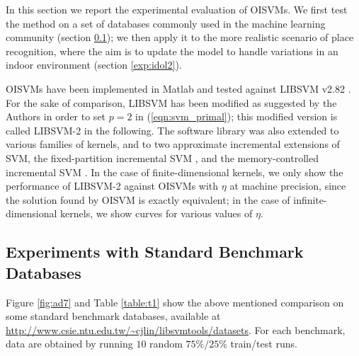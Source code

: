 In this section we report the experimental evaluation of OISVMs. We
first test the method on a set of databases commonly used in the
machine learning community (section \ref{exp:ml}); we then apply it to
the more realistic scenario of place recognition, where the aim is to
update the model to handle variations in an indoor environment
 (section
\ref{exp:idol2}).

OISVMs have been implemented in Matlab and tested against LIBSVM v2.82
\cite{ChangL01}. For the sake of comparison, LIBSVM has been modified
as suggested by the Authors in order to set $p=2$ in
(\ref{eqn:svm_primal}); this modified version is called LIBSVM-2 in
the following.  The software library was also extended to various
families of kernels, and to two approximate incremental extensions of
SVM, the fixed-partition incremental SVM \cite{syed99incremental}, and
the memory-controlled incremental SVM \cite{pronobis:icvs06}.  In the case
of finite-dimensional kernels, we only show the performance of
LIBSVM-2 against OISVMs with $\eta$ at machine precision, since the
solution found by OISVM is exactly equivalent; in the case of
infinite-dimensional kernels, we show curves for various values of
$\eta$.

\subsection{Experiments with Standard Benchmark Databases}
\label{exp:ml}

Figure \ref{fig:ad7} and Table \ref{table:t1} show the above mentioned
comparison on some standard benchmark databases, available at
\url{http://www.csie.ntu.edu.tw/~cjlin/libsvmtools/datasets}.  For
each benchmark, data are obtained by running $10$ random $75\%/25\%$
train/test runs.

